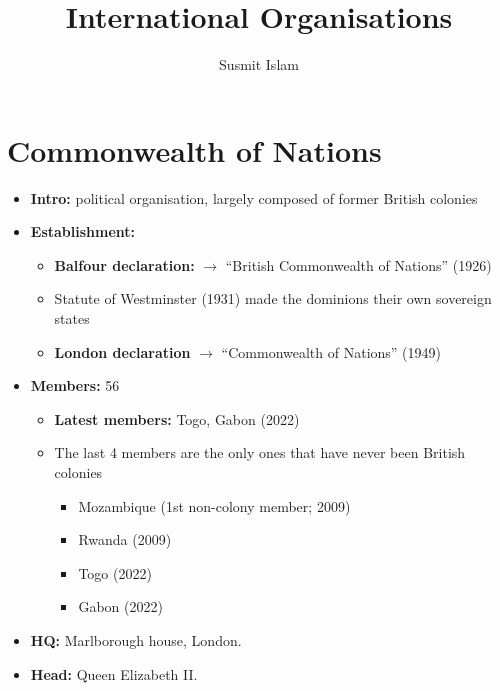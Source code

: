 \documentclass[
  12pt,
]{article}
\title{International Organisations}
\author{Susmit Islam}
\date{}
\providecommand{\tightlist}{%
  \setlength{\itemsep}{0pt}\setlength{\parskip}{0pt}}
\begin{document}
\maketitle

\renewcommand{\labelitemi}{$\blacktriangleright$}
\renewcommand{\labelitemii}{$\boldsymbol\circ$}
\renewcommand{\labelitemiii}{$\bullet$}
\renewcommand{\labelitemiv}{\tiny$\blacksquare$}

\tableofcontents

\hypertarget{commonwealth-of-nations}{%
\section{Commonwealth of Nations}\label{commonwealth-of-nations}}

\begin{itemize}
\tightlist
\item
  \textbf{Intro:} political organisation, largely composed of former
  British colonies
\item
  \textbf{Establishment:}

  \begin{itemize}
  \tightlist
  \item
    \textbf{Balfour declaration:} \(\rightarrow\) ``British Commonwealth
    of Nations'' (1926)
  \item
    Statute of Westminster (1931) made the dominions their own sovereign
    states
  \item
    \textbf{London declaration} \(\rightarrow\) ``Commonwealth of
    Nations'' (1949)
  \end{itemize}
\item
  \textbf{Members:} 56

  \begin{itemize}
  \tightlist
  \item
    \textbf{Latest members:} Togo, Gabon (2022)
  \item
    The last 4 members are the only ones that have never been British
    colonies

    \begin{itemize}
    \tightlist
    \item
      Mozambique (1st non-colony member; 2009)
    \item
      Rwanda (2009)
    \item
      Togo (2022)
    \item
      Gabon (2022)
    \end{itemize}
  \end{itemize}
\item
  \textbf{HQ:} Marlborough house, London.
\item
  \textbf{Head:} Queen Elizabeth II.
\end{itemize}
\end{document}
